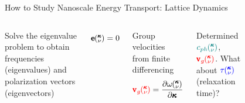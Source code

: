 \documentclass{beamer}
\newcommand{\kv}{\mspace{-4.0mu}\left(\mspace{-8.0mu}
\begin{smallmatrix}&\pmb{\kappa} \\&\nu\end{smallmatrix}
\mspace{-3.0mu}\right)}
\begin{document}
\begin{frame}{How to Study Nanoscale Energy Transport: Lattice Dynamics}
\begin{columns}

Solve the eigenvalue problem to obtain frequencies (eigenvalues) and polarization vectors (eigenvectors)

\begin{equation}
[D(\pmb{\kappa})-I\omega^2\kv]\pmb{\mathrm{e}}\kv = 0
\end{equation}

Group velocities from finite differencing
\begin{equation}\label{EQ:NMD:vg}
\begin{split}
\textcolor{red}{\pmb{\mathrm{v}}_{g}\kv}=\frac{\partial \omega \kv}{\partial \pmb{\kappa}}
\end{split}
\end{equation}

Determined $\textcolor{teal}{c_{ph}\kv}$, $\textcolor{red}{\pmb{\mathrm{v}}_{g}\kv}$. What about $\textcolor{blue}{\tau\kv}$ (relaxation time)?
\begin{figure}[t]
\begin{center}
\vspace*{-0.8cm}
\renewcommand{\figure}{Fig.}
\label{fig:bulk_dis_dos}
\end{center}
\end{figure}
\end{columns}

\end{frame}
\end{document}
